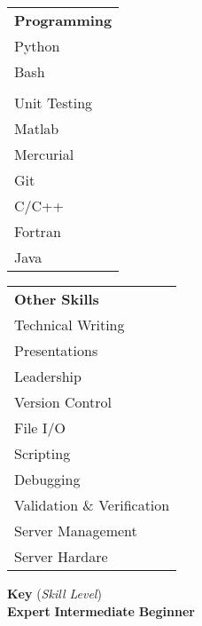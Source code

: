 \begin{minipage}{0.20\textwidth}
	\begin{center}
\begin{tabular}{l}
	{\large\textbf{Programming}} \\
	\highskillcolor Python \\
	\highskillcolor Bash \\ 
	\highskillcolor {\fontfamily{ptm}\selectfont \LaTeX} \\ 
	\highskillcolor Unit Testing \\
	\highskillcolor Matlab \\
	\highskillcolor Mercurial \\
	\medskillcolor Git \\
	\medskillcolor C/C++ \\
	\medskillcolor Fortran \\
	\lowskillcolor Java \\
\end{tabular}
	\end{center}
\end{minipage}%
\begin{minipage}{0.25\textwidth}
	\begin{center} 
\begin{tabular}{l}
	{\large\textbf{Other Skills}} \\
	\highskillcolor Technical Writing \\
	\highskillcolor Presentations \\
	\highskillcolor Leadership \\
	\highskillcolor Version Control \\
	\highskillcolor File I/O \\ 
	\highskillcolor Scripting \\ 
	\medskillcolor Debugging \\
	\medskillcolor Validation \& Verification \\
	\lowskillcolor Server Management \\
	\lowskillcolor Server Hardare \\
\end{tabular}
	\end{center}
\end{minipage}%
%
%

\begin{center}
\begin{minipage}{0.6\textwidth}
	\begin{center}{\large\textbf{Key}} (\textit{Skill Level}) \\ 
	\highskillcolor \textbf{Expert}
	\medskillcolor \textbf{Intermediate}
	\lowskillcolor \textbf{Beginner} 
	\end{center}
\end{minipage}
\end{center}
